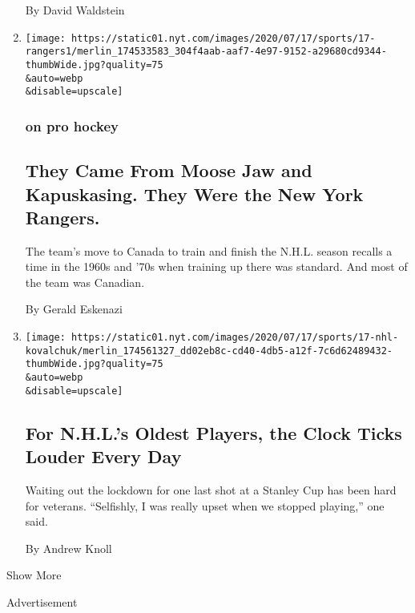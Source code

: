 \begin{enumerate}
  By David Waldstein
\item
  \href{/2020/07/19/sports/hockey/coronavirus-nhl-canada-season.html}{}

  \texttt{[image: https://static01.nyt.com/images/2020/07/17/sports/17-rangers1/merlin\_174533583\_304f4aab-aaf7-4e97-9152-a29680cd9344-thumbWide.jpg?quality=75\\\&auto=webp\\\&disable=upscale]}

  \hypertarget{on-pro-hockey}{%
  \subsubsection{on pro hockey}\label{on-pro-hockey}}

  \hypertarget{they-came-from-moose-jaw-and-kapuskasing-they-were-the-new-york-rangers}{%
  \subsection{They Came From Moose Jaw and Kapuskasing. They Were the
  New York
  Rangers.}\label{they-came-from-moose-jaw-and-kapuskasing-they-were-the-new-york-rangers}}

  The team's move to Canada to train and finish the N.H.L. season
  recalls a time in the 1960s and '70s when training up there was
  standard. And most of the team was Canadian.

  By Gerald Eskenazi
\item
  \href{/2020/07/17/sports/hockey/nhl-training-camp-veterans.html}{}

  \texttt{[image: https://static01.nyt.com/images/2020/07/17/sports/17-nhl-kovalchuk/merlin\_174561327\_dd02eb8c-cd40-4db5-a12f-7c6d62489432-thumbWide.jpg?quality=75\\\&auto=webp\\\&disable=upscale]}

  \hypertarget{for-nhls-oldest-players-the-clock-ticks-louder-every-day}{%
  \subsection{For N.H.L.'s Oldest Players, the Clock Ticks Louder Every
  Day}\label{for-nhls-oldest-players-the-clock-ticks-louder-every-day}}

  Waiting out the lockdown for one last shot at a Stanley Cup has been
  hard for veterans. ``Selfishly, I was really upset when we stopped
  playing,'' one said.

  By Andrew Knoll
\end{enumerate}

Show More

Advertisement

